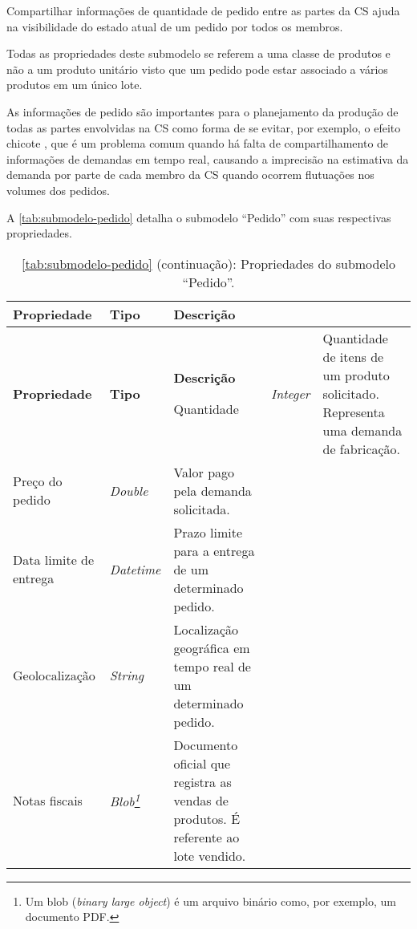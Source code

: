 Compartilhar informações de quantidade de pedido entre as partes da CS ajuda na visibilidade do estado atual de um pedido por todos os membros.

Todas as propriedades deste submodelo se referem a uma classe de produtos e não a um produto unitário visto que um pedido pode estar associado a vários produtos em um único lote.

As informações de pedido são importantes para o planejamento da produção de todas as partes envolvidas na CS como forma de se evitar, por exemplo, o efeito chicote \cite{lee1997bullwhip}, que é um problema comum quando há falta de compartilhamento de informações de demandas em tempo real, causando a imprecisão na estimativa da demanda por parte de cada membro da CS quando ocorrem flutuações nos volumes dos pedidos.

A \autoref{tab:submodelo-pedido} detalha o submodelo ``Pedido'' com suas respectivas propriedades.

\begin{longtable}{|p{}|p{}|p{}|}

	\caption{\label{tab:submodelo-pedido} Propriedades do submodelo ``Pedido''.}
	\\ \hline \textbf{Propriedade} & \textbf{Tipo} & \textbf{Descrição}
	\endfirsthead

	\caption*{\autoref{tab:submodelo-pedido} (continuação): Propriedades do submodelo ``Pedido''.}
	\\ \hline \textbf{Propriedade} & \textbf{Tipo}    & \textbf{Descrição}
	\endhead

	\hline Quantidade & \textit{Integer} & Quantidade de itens de um produto solicitado. Representa uma demanda de fabricação.

	\\ \hline Preço do pedido & \textit{Double} & Valor pago pela demanda solicitada.

	\\ \hline Data limite de entrega & \textit{Datetime} & Prazo limite para a entrega de um determinado pedido.

	\\ \hline Geolocalização & \textit{String} & Localização geográfica em tempo real de um determinado pedido.

	\\ \hline Notas fiscais & \textit{Blob\footnote{Um blob (\textit{binary large object}) é um arquivo binário como, por exemplo, um documento PDF.}} & Documento oficial que registra as vendas de produtos. É referente ao lote vendido.

	\\ \hline
\end{longtable}

